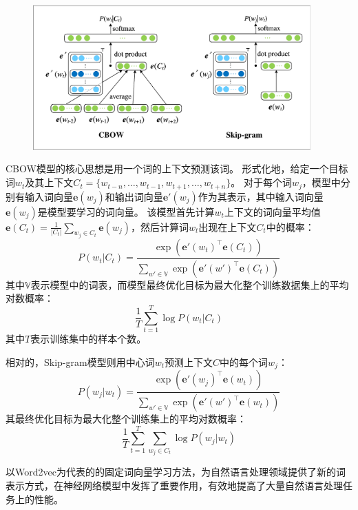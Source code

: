 \begin{figure}[htbp]
    \centering
    \includegraphics[width=0.95\textwidth]{figures/word2vec.pdf}
\end{figure}

CBOW模型的核心思想是用一个词的上下文预测该词。
形式化地，给定一个目标词$w_t$及其上下文$C_t=\{w_{t-n},\dots,w_{t-1},w_{t+1},\dots,w_{t+n}\}$。
对于每个词$w_j$，模型中分别有输入词向量$\bm{e}(w_j)$和输出词向量$\bm{e}'(w_j)$作为其表示，其中输入词向量$\bm{e}(w_j)$是模型要学习的词向量。
该模型首先计算$w_t$上下文的词向量平均值$\bm{e}(C_t)=\frac{1}{|C_t|}\sum_{w_j\in C_t}\bm{e}(w_j)$，然后计算词$w_t$出现在上下文$C_t$中的概率：
\begin{equation}
    P(w_t|C_t)=\frac{\exp(\bm{e'}(w_t)^{\top}\bm{e}(C_t))}{\sum_{w'\in \mathbb{V}}\exp(\bm{e'}(w')^{\top}\bm{e}(C_t))}
\end{equation}
其中$\mathbb{V}$表示模型中的词表，而模型最终优化目标为最大化整个训练数据集上的平均对数概率：
\begin{equation}
    \frac{1}{T}\sum_{t=1}^{T}\log P(w_t|C_t)
\end{equation}
其中$T$表示训练集中的样本个数。

相对的，Skip-gram模型则用中心词$w_t$预测上下文$C$中的每个词$w_j$：
\begin{equation}
    P(w_j|w_t)=\frac{\exp(\bm{e'}(w_j)^{\top}\bm{e}(w_t))}{\sum_{w'\in \mathbb{V}}\exp(\bm{e'}(w')^{\top}\bm{e}(w_t))}
\end{equation}
其最终优化目标为最大化整个训练集上的平均对数概率：
\begin{equation}
    \frac{1}{T}\sum_{t=1}^{T} \sum_{w_j\in C_t} \log P(w_j|w_t)
\end{equation}

以Word2vec为代表的的固定词向量学习方法，为自然语言处理领域提供了新的词表示方式，在神经网络模型中发挥了重要作用，有效地提高了大量自然语言处理任务上的性能。

